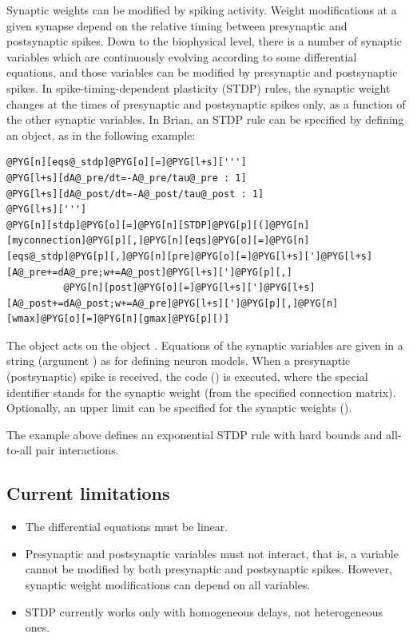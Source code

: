 \documentclass[letterpaper,10pt,english]{manual}
\begin{document}
Synaptic weights can be modified by spiking activity.
Weight modifications at a given synapse depend on the relative
timing between presynaptic and postsynaptic spikes. Down to the
biophysical level, there is a number of synaptic variables which
are continuously evolving according to some differential equations,
and those variables can be modified by presynaptic and postsynaptic
spikes. In spike-timing-dependent plasticity (STDP) rules, the synaptic weight
changes at the times of presynaptic and postsynaptic
spikes only, as a function of the other synaptic variables.
In Brian, an STDP rule can be specified by defining an
\hyperlink{brian.STDP}{} object, as in the following example:

\begin{Verbatim}[commandchars=@\[\]]
@PYG[n][eqs@_stdp]@PYG[o][=]@PYG[l+s][''']
@PYG[l+s][dA@_pre/dt=-A@_pre/tau@_pre : 1]
@PYG[l+s][dA@_post/dt=-A@_post/tau@_post : 1]
@PYG[l+s][''']
@PYG[n][stdp]@PYG[o][=]@PYG[n][STDP]@PYG[p][(]@PYG[n][myconnection]@PYG[p][,]@PYG[n][eqs]@PYG[o][=]@PYG[n][eqs@_stdp]@PYG[p][,]@PYG[n][pre]@PYG[o][=]@PYG[l+s][']@PYG[l+s][A@_pre+=dA@_pre;w+=A@_post]@PYG[l+s][']@PYG[p][,]
          @PYG[n][post]@PYG[o][=]@PYG[l+s][']@PYG[l+s][A@_post+=dA@_post;w+=A@_pre]@PYG[l+s][']@PYG[p][,]@PYG[n][wmax]@PYG[o][=]@PYG[n][gmax]@PYG[p][)]
\end{Verbatim}

The \hyperlink{brian.STDP}{} object acts on the \hyperlink{brian.Connection}{} object
. Equations of the synaptic variables are given in
a string (argument ) as for defining neuron models.
When a presynaptic (postsynaptic) spike is received, the code
 () is executed, where the special identifier
 stands for the synaptic weight (from the specified
connection matrix). Optionally, an upper limit can be specified
for the synaptic weights ().

The example above defines an exponential STDP rule with hard bounds
and all-to-all pair interactions.


\subsection{Current limitations}
\begin{itemize}
\item {} 
The differential equations must be linear.

\item {} 
Presynaptic and postsynaptic variables must not interact, that is,
a variable cannot be modified by both presynaptic and postsynaptic
spikes. However, synaptic weight modifications can depend on all variables.

\item {} 
STDP currently works only with homogeneous delays, not heterogeneous ones.

\end{itemize}
\end{document}
